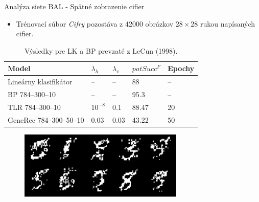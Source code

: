 \documentclass[xcolor=dvipsnames]{beamer}
\begin{document}
\begin{frame}{Analýza siete BAL - Spätné zobrazenie cifier}
  \begin{itemize} 
    \item Trénovací súbor \emph{Cifry} pozostáva z 42000 obrázkov $28 \times 28$ rukou napísaných cifier. 
  \end{itemize} 

  \begin{table}[H] 
    \centering
      \begin{tabular}{|l|l|l|l|l|}
      \hline
      Model&$\lambda_h$&$\lambda_v$&$patSucc^F$ &Epochy\\ %
      \hline
      Lineárny klasifikátor & -- & -- & 88 & -- \\ 
      \hline
      BP 784--300--10& -- & -- & 95.3 & -- \\ 
      \hline 
      TLR 784--300--10& $10^{-8}$ & 0.1 & 88.47 & 20 \\
      \hline 
      GeneRec 784--300--50--10& 0.03 & 0.03 & 43.22 & 50 \\
      \hline 
      \end{tabular}
    \caption{Výsledky pre LK a BP prevzaté z LeCun (1998).} 
    \label{tab:results-cmp-digits}
  \end{table}

  \begin{figure}[H]
    \centering
    \includegraphics[width=0.7\textwidth]{img/tlr-digits.png}  
  \end{figure}   

\end{frame}

\end{document}
